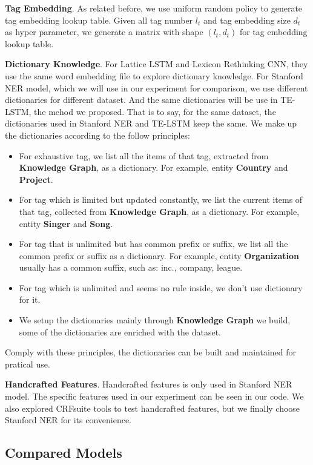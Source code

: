 \documentclass[letterpaper]{article} %
\begin{document}
\textbf{Tag Embedding}. As related before, we use uniform random policy to generate tag embedding lookup table. Given all tag number $l_t$ and tag embedding size $d_t$ as hyper parameter, we generate a matrix with shape $(l_t, d_t)$ for tag embedding lookup table.

\textbf{Dictionary Knowledge}. For Lattice LSTM and Lexicon Rethinking CNN, they use the same word embedding file to explore dictionary knowledge. For Stanford NER \cite{stner} model, which we will use in our experiment for comparison, we use different dictionaries for different dataset. And the same dictionaries will be use in TE-LSTM, the mehod we proposed. That is to say, for the same dataset, the dictionaries used in Stanford NER and TE-LSTM keep the same. We make up the dictionaries according to the follow principles:

\begin{itemize}
\item For exhaustive tag, we list all the items of that tag, extracted from \textbf{Knowledge Graph}, as a dictionary. For example, entity \textbf{Country} and \textbf{Project}.
\item For tag which is limited but updated constantly, we list the current items of that tag, collected from \textbf{Knowledge Graph}, as a dictionary. For example, entity \textbf{Singer} and \textbf{Song}.
\item For tag that is unlimited but has common prefix or suffix, we list all the common prefix or suffix as a dictionary. For example, entity \textbf{Organization} usually has a common suffix, such as: inc., company, league.
\item For tag which is unlimited and seems no rule inside, we don't use dictionary for it.
\item We setup the dictionaries mainly through \textbf{Knowledge Graph} we build, some of the dictionaries are enriched with the dataset.
\end{itemize}

Comply with these principles, the dictionaries can be built and maintained for pratical use.

\textbf{Handcrafted Features}. Handcrafted features is only used in Stanford NER model. The specific features used in our experiment can be seen in our code. We also explored CRFsuite tools \cite{CRFsuite} to test handcrafted features, but we finally choose Stanford NER for its convenience.


\subsection{Compared Models}
\end{document}
